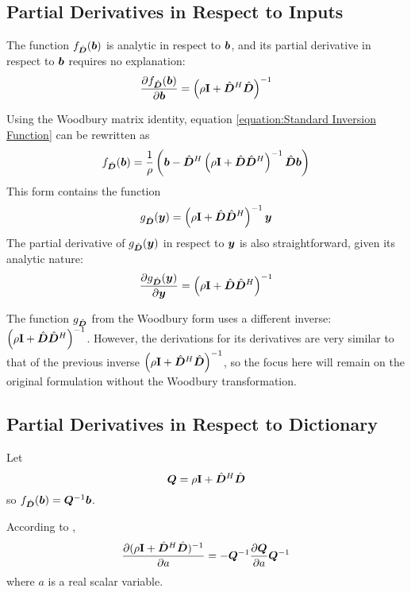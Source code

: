 \begin{appendices}
\subsection{Partial Derivatives in Respect to Inputs}
The function $f_{\hat{\bm{D}}}(\bm{b})$ is analytic in respect to $\bm{b}$, and its partial derivative in respect to $\bm{b}$ requires no explanation:
\begin{equation}
\frac{\partial f_{\hat{\bm{D}}}(\bm{b})}{\partial \bm{b}} = \left(\rho{\bf I} + \hat{\bm{D}}^H\hat{\bm{D}}\right)^{-1}
\end{equation}

Using the Woodbury matrix identity, equation \ref{equation:Standard Inversion Function} can be rewritten as
\begin{equation}
f_{\hat{\bm{D}}}(\bm{b}) = \frac{1}{\rho}\left(\bm{b} - \hat{\bm{D}}^H\left(\rho{\bf I} + \hat{\bm{D}}\hat{\bm{D}}^H\right)^{-1}\hat{\bm{D}}\bm{b}\right) \label{equation:Woodbury Inversion Function}
\end{equation}
This form contains the function
\begin{equation}
g_{\hat{\bm{D}}}(\bm{y}) = \left(\rho{\bf I} + \hat{\bm{D}}\hat{\bm{D}}^H\right)^{-1}\bm{y}
\end{equation}
%
The partial derivative of $g_{\hat{\bm{D}}}(\bm{y})$ in respect to $\bm{y}$ is also straightforward, given its analytic nature:
\begin{equation}
\frac{\partial g_{\hat{\bm{D}}}(\bm{y})}{\partial \bm{y}} = \left(\rho{\bf I} + \hat{\bm{D}}\hat{\bm{D}}^H\right)^{-1}
\end{equation}

The function $g_{\hat{\bm{D}}}$ from the Woodbury form uses a different inverse: $\left(\rho{\bf I} + \hat{\bm{D}}\hat{\bm{D}}^H\right)^{-1}$. However, the derivations for its derivatives are very similar to that of the previous inverse $\left(\rho{\bf I} + \hat{\bm{D}}^H\hat{\bm{D}}\right)^{-1}$, so the focus here will remain on the original formulation without the Woodbury transformation.

\subsection{Partial Derivatives in Respect to Dictionary} \label{section:Differentiating Standard Form}
Let
%
\begin{equation}
\bm{Q} = \rho{\bf I} + \hat{\bm{D}}^H\hat{\bm{D}}
\end{equation}
%
so $f_{\hat{\bm{D}}}(\bm{b}) = \bm{Q}^{-1}\bm{b}$.

According to \cite{petersen2008matrix},
\begin{equation} \label{equation:Derivative of Inverse}
\frac{\partial (\rho{\bf I} + \hat{\bm{D}}^H\hat{\bm{D}})^{-1}}{\partial a} = -\bm{Q}^{-1}\frac{\partial \bm{Q}}{\partial a}\bm{Q}^{-1}
\end{equation}
where $a$ is a real scalar variable.


\end{appendices}
